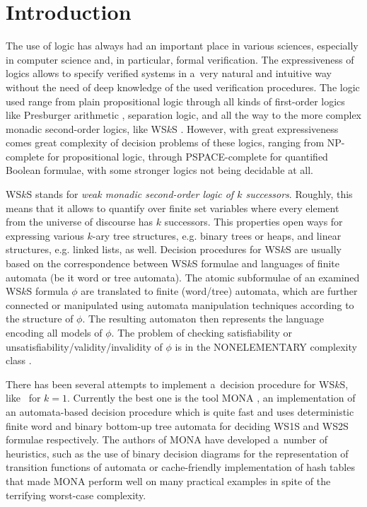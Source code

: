 \chapter{Introduction}
 
The use of logic has always had an important place in various sciences,
especially in computer science and, in particular, formal verification. The
expressiveness of logics allows to specify verified systems in a~very natural
and intuitive way without the need of deep knowledge of the used verification
procedures. The logic used range from plain propositional logic through all
kinds of first-order logics like Presburger arithmetic \cite{presburger},
separation logic, and all the way to the more complex monadic second-order
logics, like WS$k$S \cite{wsks}. However, with great expressiveness comes great
complexity of decision problems of these logics, ranging from NP-complete for
propositional logic, through PSPACE-complete for quantified Boolean formulae,
with some stronger logics not being decidable at all.

WS$k$S stands for \emph{weak monadic second-order logic of $k$ successors}.
Roughly, this means that it allows to quantify over finite set variables where
every element from the universe of discourse has $k$ successors. This properties
open ways for expressing various $k$-ary tree structures, e.g. binary trees or
heaps, and linear structures, e.g. linked lists, as well. Decision procedures
for WS$k$S are usually based on the correspondence between WS$k$S formulae and
languages of finite automata (be it word or tree automata). The atomic
subformulae of an
examined WS$k$S formula $\phi$ are translated to finite (word/tree)
automata, which are further connected or manipulated using automata manipulation
techniques according to the structure of $\phi$. The resulting automaton then
represents the language encoding all models of $\phi$. The problem of checking
satisfiability or unsatisfiability/validity/invalidity of $\phi$ is in the
NONELEMENTARY complexity class \cite{wsksisnonelementary}.

There has been several attempts to implement a~decision procedure for WS$k$S,
like~\cite{nfa} for $k = 1$. Currently the best one is the tool \textsc{MONA}
\cite{mona-tacas}, an implementation of an automata-based decision procedure
which is quite fast and uses deterministic finite word and binary bottom-up tree automata
for deciding WS1S and WS2S formulae respectively. The authors of \textsc{MONA}
have developed a~number of heuristics, such as the use of binary decision
diagrams for the representation of transition functions of automata or
cache-friendly implementation of hash tables that made \textsc{MONA} perform
well on many practical examples in spite of the terrifying worst-case
complexity.

